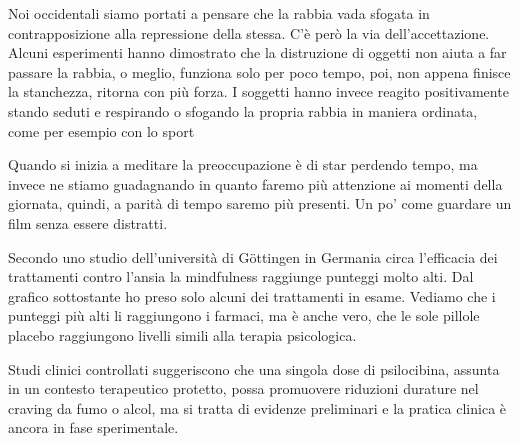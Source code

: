 \documentclass[12pt]{book} %
\begin{document}
Noi occidentali siamo portati a pensare che la rabbia vada sfogata in contrapposizione alla repressione della stessa.
C'è però la via dell'accettazione. Alcuni esperimenti hanno dimostrato che la
distruzione di oggetti non aiuta a far passare la rabbia, o meglio, funziona solo per poco tempo, poi, non appena finisce la stanchezza, ritorna con più forza. I soggetti hanno invece reagito positivamente stando seduti e respirando o sfogando la propria rabbia in maniera
ordinata, come per esempio con lo sport

Quando si inizia a meditare la preoccupazione è di star perdendo tempo, ma invece ne stiamo guadagnando in quanto faremo più attenzione ai momenti della giornata, quindi, a parità di tempo saremo più presenti. Un po' come guardare un film senza essere distratti.

Secondo uno studio dell'università di Göttingen in Germania circa l'efficacia
dei trattamenti contro
l'ansia la mindfulness raggiunge punteggi molto alti. Dal grafico sottostante ho preso solo alcuni dei trattamenti in esame.
Vediamo che i punteggi più alti li raggiungono i farmaci, ma è anche vero, che le sole pillole placebo raggiungono
livelli simili alla terapia psicologica.

\needspace{4cm}
\begin{figure}[H]
  \centering
\end{figure}

Studi clinici controllati suggeriscono che una singola dose di psilocibina, assunta in un contesto terapeutico protetto, possa promuovere riduzioni durature nel craving da fumo o alcol, ma si tratta di evidenze preliminari e la pratica clinica è ancora in fase sperimentale.
\end{document}
